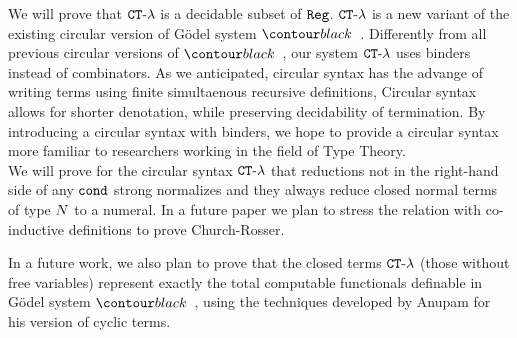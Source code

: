 We will prove that ${ {\tt CT}\mbox{-}\lambda}$ is a decidable subset of ${\tt Reg}$.
${ {\tt CT}\mbox{-}\lambda}$ is a new variant of the existing circular version of 
G\"{o}del system $\systemT$. Differently from all previous circular versions of 
$\systemT$, our system ${ {\tt CT}\mbox{-}\lambda}$ uses binders instead of combinators. 
As we anticipated, circular syntax has the advange of writing terms using
finite simultaenous recursive definitions,
Circular syntax allows for shorter denotation, while preserving decidability of 
termination. By introducing a circular syntax with binders, 
we hope to provide a circular syntax more familiar to researchers working in the
field of Type Theory.
\\

We will prove for the circular syntax ${ {\tt CT}\mbox{-}\lambda}$
that reductions not in the right-hand side of any ${\tt cond}$ strong normalizes
and they always reduce closed normal terms of type ${N}$ to a numeral.
In a future paper we plan to stress the relation with co-inductive definitions
to prove Church-Rosser.

In a future work, we also plan to prove that the closed terms ${ {\tt CT}\mbox{-}\lambda}$ 
(those without free variables) represent exactly the total computable functionals 
definable in G\"{o}del system $\systemT$, using the techniques developed by 
Anupam for his version of cyclic terms.



